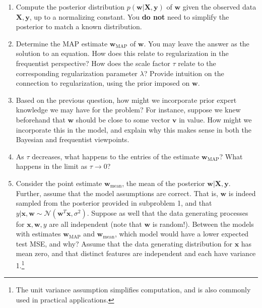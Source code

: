 \documentclass[submit]{harvardml}
\begin{document}
\begin{problem}
    \begin{enumerate}
    
        \item Compute the posterior distribution $p(\mathbf{w}|\mathbf{X}, \mathbf{y})$ of $\mathbf{w}$ given the observed data $\mathbf{X}, \mathbf{y}$, up to a normalizing constant. You \textbf{do not} need to simplify the posterior to match a known distribution.
        
        \item Determine the MAP estimate $\mathbf{w}_{\mathrm{MAP}}$ of $\mathbf{w}$. You may leave the answer as the solution to an equation. How does this relate to regularization in the frequentist perspective? How does the scale factor $\tau$ relate to the corresponding regularization parameter $\lambda$? Provide intuition on the connection to regularization, using the prior imposed on $\mathbf{w}$.
        
        \item Based on the previous question, how might we incorporate prior expert knowledge we may have for the problem? For instance, suppose we knew beforehand that $\mathbf{w}$ should be close to some vector $\mathbf{v}$ in value. How might we incorporate this in the model, and explain why this makes sense in both the Bayesian and frequentist viewpoints.
        
        \item As $\tau$ decreases, what happens to the entries of the estimate $\mathbf{w}_{\mathrm{MAP}}$? What happens in the limit as $\tau \to 0$?
        
        \item Consider the point estimate $\mathbf{w}_{\mathrm{mean}}$, the mean of the posterior $\mathbf{w}|\mathbf{X},\mathbf{y}$. Further, assume that the model assumptions are correct. That is, $\mathbf{w}$ is indeed sampled from the posterior provided in subproblem 1, and that $y|\mathbf{x},\mathbf{w}\sim\mathcal{N}(\mathbf{w}^T\mathbf{x},\sigma^2)$. Suppose as well that the data generating processes for $\mathbf{x},\mathbf{w},y$ are all independent (note that $\mathbf{w}$ is random!). Between the models with estimates $\mathbf{w}_{\mathrm{MAP}}$ and $\mathbf{w}_{\mathrm{mean}}$, which model would have a lower expected test MSE, and why? Assume that the data generating distribution for $\mathbf{x}$ has mean zero, and that distinct features are independent and each have variance 1.\footnote{The unit variance assumption simplifies computation, and is also commonly used in practical applications.}
        
    \end{enumerate}
  
  
\end{problem}
\end{document}
